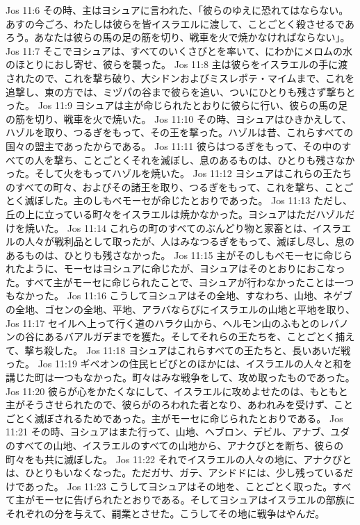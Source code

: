 Jos 11:6  その時、主はヨシュアに言われた、「彼らのゆえに恐れてはならない。あすの今ごろ、わたしは彼らを皆イスラエルに渡して、ことごとく殺させるであろう。あなたは彼らの馬の足の筋を切り、戦車を火で焼かなければならない」。
Jos 11:7  そこでヨシュアは、すべてのいくさびとを率いて、にわかにメロムの水のほとりにおし寄せ、彼らを襲った。
Jos 11:8  主は彼らをイスラエルの手に渡されたので、これを撃ち破り、大シドンおよびミスレポテ・マイムまで、これを追撃し、東の方では、ミヅパの谷まで彼らを追い、ついにひとりも残さず撃ちとった。
Jos 11:9  ヨシュアは主が命じられたとおりに彼らに行い、彼らの馬の足の筋を切り、戦車を火で焼いた。
Jos 11:10  その時、ヨシュアはひきかえして、ハゾルを取り、つるぎをもって、その王を撃った。ハゾルは昔、これらすべての国々の盟主であったからである。
Jos 11:11  彼らはつるぎをもって、その中のすべての人を撃ち、ことごとくそれを滅ぼし、息のあるものは、ひとりも残さなかった。そして火をもってハゾルを焼いた。
Jos 11:12  ヨシュアはこれらの王たちのすべての町々、およびその諸王を取り、つるぎをもって、これを撃ち、ことごとく滅ぼした。主のしもべモーセが命じたとおりであった。
Jos 11:13  ただし、丘の上に立っている町々をイスラエルは焼かなかった。ヨシュアはただハゾルだけを焼いた。
Jos 11:14  これらの町のすべてのぶんどり物と家畜とは、イスラエルの人々が戦利品として取ったが、人はみなつるぎをもって、滅ぼし尽し、息のあるものは、ひとりも残さなかった。
Jos 11:15  主がそのしもべモーセに命じられたように、モーセはヨシュアに命じたが、ヨシュアはそのとおりにおこなった。すべて主がモーセに命じられたことで、ヨシュアが行わなかったことは一つもなかった。
Jos 11:16  こうしてヨシュアはその全地、すなわち、山地、ネゲブの全地、ゴセンの全地、平地、アラバならびにイスラエルの山地と平地を取り、
Jos 11:17  セイルへ上って行く道のハラク山から、ヘルモン山のふもとのレバノンの谷にあるバアルガデまでを獲た。そしてそれらの王たちを、ことごとく捕えて、撃ち殺した。
Jos 11:18  ヨシュアはこれらすべての王たちと、長いあいだ戦った。
Jos 11:19  ギベオンの住民ヒビびとのほかには、イスラエルの人々と和を講じた町は一つもなかった。町々はみな戦争をして、攻め取ったものであった。
Jos 11:20  彼らが心をかたくなにして、イスラエルに攻めよせたのは、もともと主がそうさせられたので、彼らがのろわれた者となり、あわれみを受けず、ことごとく滅ぼされるためであった。主がモーセに命じられたとおりである。
Jos 11:21  その時、ヨシュアはまた行って、山地、ヘブロン、デビル、アナブ、ユダのすべての山地、イスラエルのすべての山地から、アナクびとを断ち、彼らの町々をも共に滅ぼした。
Jos 11:22  それでイスラエルの人々の地に、アナクびとは、ひとりもいなくなった。ただガサ、ガテ、アシドドには、少し残っているだけであった。
Jos 11:23  こうしてヨシュアはその地を、ことごとく取った。すべて主がモーセに告げられたとおりである。そしてヨシュアはイスラエルの部族にそれぞれの分を与えて、嗣業とさせた。こうしてその地に戦争はやんだ。
